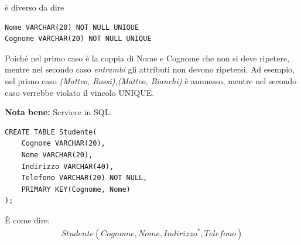 \documentclass{article}
\newcounter{esempio}
\begin{document}
\begin{itemize}
	è diverso da dire
	
\begin{lstlisting}[style=sqlstyle]
Nome VARCHAR(20) NOT NULL UNIQUE
Cognome VARCHAR(20) NOT NULL UNIQUE
\end{lstlisting}

Poiché nel primo caso è la coppia di Nome e Cognome che non si deve ripetere, mentre nel secondo caso \textit{entrambi} gli attributi non devono ripetersi. Ad esempio, nel primo caso \textit{(Matteo, Rossi),(Matteo, Bianchi)} è ammesso, mentre nel secondo caso verrebbe violato il vincolo UNIQUE.

\vspace{1em}
\textbf{Nota bene:} Scrviere in SQL:

\begin{lstlisting}[style=sqlstyle]
CREATE TABLE Studente(
    Cognome VARCHAR(20),
    Nome VARCHAR(20),
    Indirizzo VARCHAR(40),
    Telefono VARCHAR(20) NOT NULL,
    PRIMARY KEY(Cognome, Nome)
);
\end{lstlisting}

È come dire:
\begin{align*}
     Studente(\underline{Cognome},\underline{Nome}, Indirizzo^*,Telefono)
\end{align*}
\end{itemize}
\end{document}
